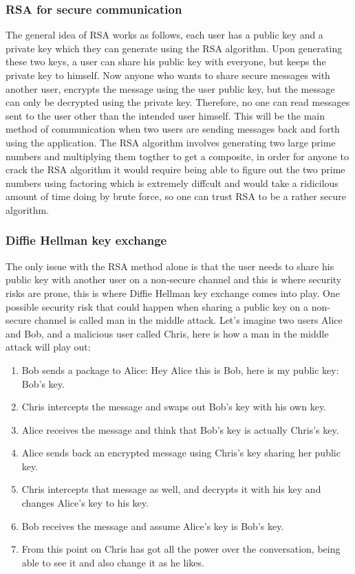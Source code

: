\documentclass[twoside]{article}
\begin{document}
\begin{multicols}{2}
\subsubsection{RSA for secure communication}
The general idea of RSA works as follows, each user has a public key and a private key which they can generate using the RSA algorithm. Upon generating these two keys, a user can share his public key with 
everyone, but keeps 
the private key to himself. Now anyone who wants to share secure messages with another user, encrypts the message using the user public key, but the message can only be decrypted using the private key. Therefore, no 
one can read messages sent to the user other than the intended user himself. This will be the main method of communication when two users are sending messages back and forth using the application. The RSA algorithm involves generating two large prime numbers and multiplying them togther to get a composite, in order for anyone to 
crack the RSA algorithm it would require being able to figure out the two prime numbers using factoring which is extremely diffcult and would take a ridicilous amount of time doing by brute force, so one can 
trust RSA to be a rather secure algorithm.
\subsubsection{Diffie Hellman key exchange}
The only issue with the RSA method alone is that the user needs to share his public key with another user on a non-secure channel and this 
is where security risks are prone, this is where Diffie Hellman key exchange comes into play. One possible security risk that could happen when sharing a public key on a non-secure channel is called man in the middle attack. Let's imagine two users Alice and Bob, and a malicious user called Chris, here is how a man in the middle attack will play out:

\begin{enumerate}
  \item Bob sends a package to Alice: Hey Alice this is Bob, here is my public key: Bob's key.
  \item Chris intercepts the message and swaps out Bob's key with his own key.
  \item Alice receives the message and think that Bob's key is actually Chris's key.
  \item Alice sends back an encrypted message using Chris's key sharing her public key. 
  \item Chris intercepts that message as well, and decrypts it with his key and changes Alice's key to his key.
  \item Bob receives the message and assume Alice's key is Bob's key.
  \item From this point on Chris has got all the power over the conversation, being able to see it and also change it as he likes. 
\end{enumerate}


\end{multicols}
\end{document}
